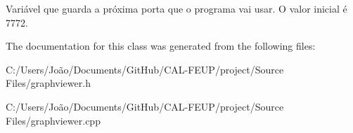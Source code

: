 Variável que guarda a próxima porta que o programa vai usar. O valor inicial é 7772. 

The documentation for this class was generated from the following files\+:\begin{DoxyCompactItemize}
\item 
C\+:/\+Users/\+João/\+Documents/\+Git\+Hub/\+C\+A\+L-\/\+F\+E\+U\+P/project/\+Source Files/graphviewer.\+h\item 
C\+:/\+Users/\+João/\+Documents/\+Git\+Hub/\+C\+A\+L-\/\+F\+E\+U\+P/project/\+Source Files/graphviewer.\+cpp\end{DoxyCompactItemize}
